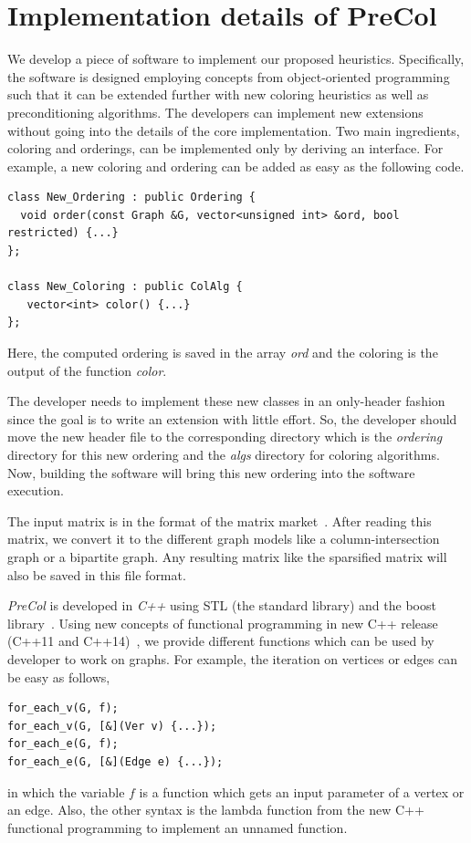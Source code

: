 \documentclass[12pt, twoside,a4paper,toc=bibliography]{scrbook}
\begin{document}
\section{Implementation details of PreCol}
\label{s.extend}
We develop a piece of software to implement our proposed heuristics.
Specifically, the software is designed employing concepts from object-oriented programming
such that it can be extended further with new coloring heuristics as well as preconditioning algorithms.
The developers can implement new extensions without going into the details of the core implementation.
Two main ingredients, coloring and orderings, can be implemented only by deriving an interface.
For example, a new coloring and ordering can be added as easy as the following code.
\begin{lstlisting}
class New_Ordering : public Ordering {
  void order(const Graph &G, vector<unsigned int> &ord, bool restricted) {...}
};

class New_Coloring : public ColAlg {
   vector<int> color() {...}
};
\end{lstlisting}
Here, the computed ordering is saved in the array \textit{ord} and the coloring is the output
of the function \textit{color}.

The developer needs to implement these new classes in an only-header fashion~\cite{headeronly}
since the goal is to write an extension with little effort. So, the developer should
move the new header file to the corresponding directory which is the \textit{ordering} directory
for this new ordering and the \textit{algs} directory for coloring algorithms.
Now, building the software will bring this new ordering into the software execution.

The input matrix is in the format of the matrix market~\cite{matrix-market}. 
After reading this matrix, we convert it to the different graph models 
like a column-intersection graph or a bipartite graph. 
Any resulting matrix like the sparsified matrix will also be saved in this file format.

\textit{PreCol} is developed in \textit{C++} using STL (the standard library) and
the boost library~\cite{boost}.
Using new concepts of functional programming
in new C++ release (C++11 and C++14)~\cite{Sutherland2015},
we provide different functions which can be used
by developer to work on graphs. For example, the iteration on vertices
or edges can be easy as follows,
\begin{lstlisting}
for_each_v(G, f);
for_each_v(G, [&](Ver v) {...});
for_each_e(G, f);
for_each_e(G, [&](Edge e) {...});
\end{lstlisting}
in which the variable $f$ is a function which gets an input parameter of a vertex or an edge.
Also, the other syntax is the lambda function
from the new C++ functional programming to implement an unnamed function.
\end{document}
